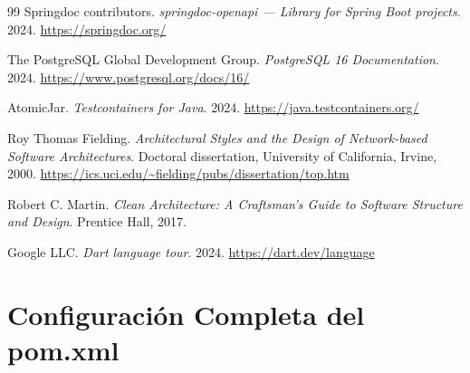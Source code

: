 \documentclass[12pt,a4paper,twoside]{report}
\begin{document}
\begin{thebibliography}{99}
Springdoc contributors.
\textit{springdoc-openapi — Library for Spring Boot projects}.
2024.
\url{https://springdoc.org/}

The PostgreSQL Global Development Group.
\textit{PostgreSQL 16 Documentation}.
2024.
\url{https://www.postgresql.org/docs/16/}

AtomicJar.
\textit{Testcontainers for Java}.
2024.
\url{https://java.testcontainers.org/}

Roy Thomas Fielding.
\textit{Architectural Styles and the Design of Network-based Software Architectures}.
Doctoral dissertation, University of California, Irvine, 2000.
\url{https://ics.uci.edu/~fielding/pubs/dissertation/top.htm}

Robert C. Martin.
\textit{Clean Architecture: A Craftsman's Guide to Software Structure and Design}.
Prentice Hall, 2017.

Google LLC.
\textit{Dart language tour}.
2024.
\url{https://dart.dev/language}

\end{thebibliography}

\appendix
\chapter{Configuración Completa del pom.xml}
\end{document}
